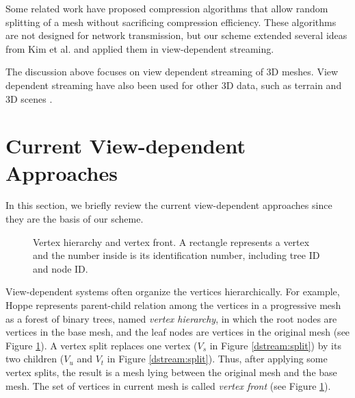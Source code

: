      Some related work \cite{multiresolution:kim, random:yoon}
     have proposed compression algorithms that allow random splitting of a mesh without
     sacrificing compression efficiency.   These algorithms are not designed for 
	 network transmission, but our scheme extended several ideas from Kim et al. \cite{multiresolution:kim}
     and applied them in view-dependent streaming.  

     The discussion above focuses on view dependent streaming of 3D meshes. View dependent streaming have also been used for other 3D data, such as terrain \cite{chang:terrains} and 3D scenes \cite{ott:tele}. 

\section{Current View-dependent\\ Approaches}
\label{s:dstream:terms}
    In this section, we briefly review the current view-dependent approaches since 
    they are the basis of our scheme.
   
    \begin{figure}
    \centering
    \caption{Vertex hierarchy and vertex front. A rectangle represents a vertex and the number inside
    is its identification number, including tree ID and node ID.\label{dstream:hierarchy}}
    \end{figure}
    View-dependent systems often organize the vertices hierarchically.
    For example, Hoppe \cite{258843} represents
    parent-child relation among the vertices in a progressive mesh
    as a forest of binary trees, named \emph{vertex hierarchy},
    in which the root nodes are vertices in the base mesh, and
    the leaf nodes are vertices in the original mesh (see Figure \ref{dstream:hierarchy}).
    A vertex split replaces one vertex ($V_s$ in Figure \ref{dstream:split})
    by its two children ($V_u$ and $V_t$ in Figure \ref{dstream:split}).
    Thus, after applying some vertex splits,
    the result is a mesh lying between the original mesh and the base mesh.
    The set of vertices in current mesh is called \emph{vertex front}
    \cite{258843}
    (see Figure \ref{dstream:hierarchy}).%
    
